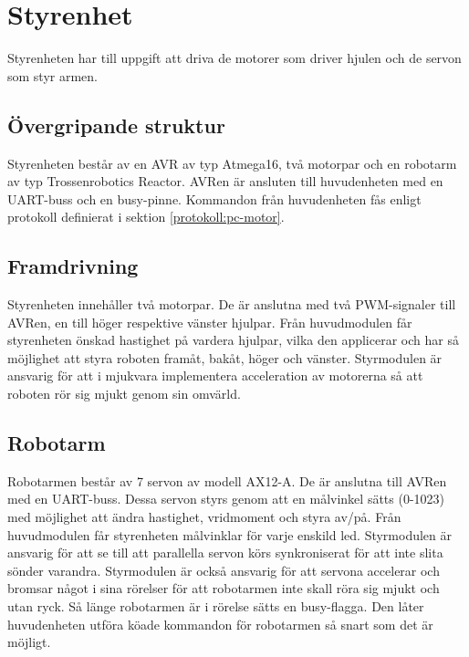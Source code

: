 
\section{Styrenhet}

Styrenheten har till uppgift att driva de motorer som driver hjulen och de servon som styr armen.

\subsection{Övergripande struktur}

Styrenheten består av en AVR av typ Atmega16, två motorpar och en robotarm av typ Trossenrobotics Reactor. AVRen är ansluten till huvudenheten med en UART-buss och en busy-pinne. Kommandon från huvudenheten fås enligt protokoll definierat i sektion \ref{protokoll:pc-motor}.\\


\subsection{Framdrivning}

Styrenheten innehåller två motorpar. De är anslutna med två PWM-signaler till AVRen, en till höger respektive vänster hjulpar. Från huvudmodulen får styrenheten önskad hastighet på vardera hjulpar, vilka den applicerar och har så möjlighet att styra roboten framåt, bakåt, höger och vänster. Styrmodulen är ansvarig för att i mjukvara implementera acceleration av motorerna så att roboten rör sig mjukt genom sin omvärld.

\subsection{Robotarm}

Robotarmen består av 7 servon av modell AX12-A. De är anslutna till AVRen med en UART-buss. Dessa servon styrs genom att en målvinkel sätts (0-1023) med möjlighet att ändra hastighet, vridmoment och styra av/på. Från huvudmodulen får styrenheten målvinklar för varje enskild led. Styrmodulen är ansvarig för att se till att parallella servon körs synkroniserat för att inte slita sönder varandra. Styrmodulen är också ansvarig för att servona accelerar och bromsar något i sina rörelser för att robotarmen inte skall röra sig mjukt och utan ryck. Så länge robotarmen är i rörelse sätts en busy-flagga. Den låter huvudenheten utföra köade kommandon för robotarmen så snart som det är möjligt. 

